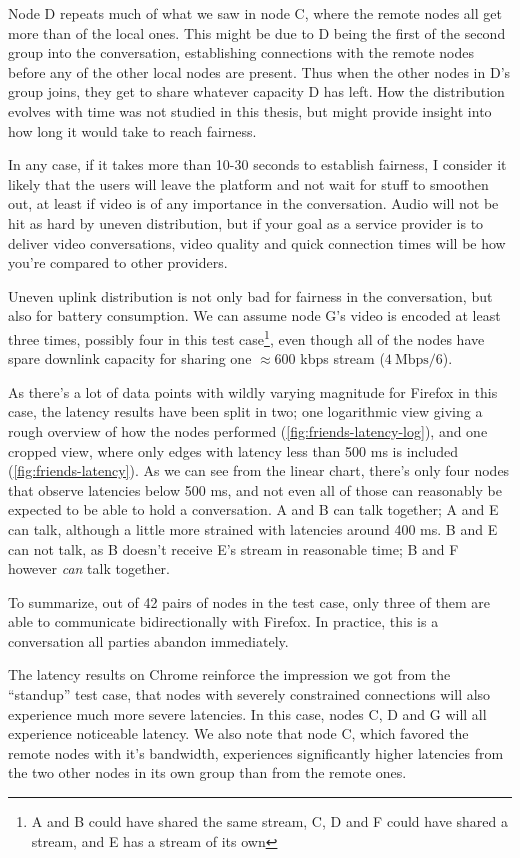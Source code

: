 Node D repeats much of what we saw in node C, where the remote nodes all get more than of the local ones. This might be due to D being the first of the second group into the conversation, establishing connections with the remote nodes before any of the other local nodes are present. Thus when the other nodes in D's group joins, they get to share whatever capacity D has left. How the distribution evolves with time was not studied in this thesis, but might provide insight into how long it would take to reach fairness.

In any case, if it takes more than 10-30 seconds to establish fairness, I consider it likely that the users will leave the platform and not wait for stuff to smoothen out, at least if video is of any importance in the conversation. Audio will not be hit as hard by uneven distribution, but if your goal as a service provider is to deliver video conversations, video quality and quick connection times will be how you're compared to other providers.

Uneven uplink distribution is not only bad for fairness in the conversation, but also for battery consumption. We can assume node G's video is encoded at least three times, possibly four in this test case\footnote{A and B could have shared the same stream, C, D and F could have shared a stream, and E has a stream of its own}, even though all of the nodes have spare downlink capacity for sharing one $\approx$600 kbps stream ($4~\text{Mbps}/6$).

As there's a lot of data points with wildly varying magnitude for Firefox in this case, the latency results have been split in two; one logarithmic view giving a rough overview of how the nodes performed (\autoref{fig:friends-latency-log}), and one cropped view, where only edges with latency less than 500 ms is included (\autoref{fig:friends-latency}). As we can see from the linear chart, there's only four nodes that observe latencies below 500 ms, and not even all of those can reasonably be expected to be able to hold a conversation. A and B can talk together; A and E can talk, although a little more strained with latencies around 400 ms. B and E can not talk, as B doesn't receive E's stream in reasonable time; B and F however \emph{can} talk together.

To summarize, out of 42 pairs of nodes in the test case, only three of them are able to communicate bidirectionally with Firefox. In practice, this is a conversation all parties abandon immediately.

The latency results on Chrome reinforce the impression we got from the ``standup'' test case, that nodes with severely constrained connections will also experience much more severe latencies. In this case, nodes C, D and G will all experience noticeable latency. We also note that node C, which favored the remote nodes with it's bandwidth, experiences significantly higher latencies from the two other nodes in its own group than from the remote ones.

